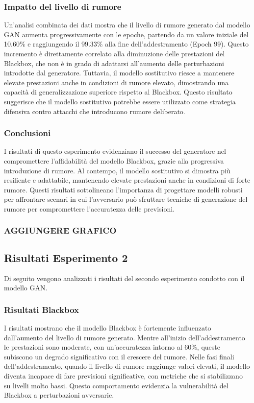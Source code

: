 \subsubsection{Impatto del livello di rumore}
Un'analisi combinata dei dati mostra che il livello di rumore generato dal modello GAN aumenta progressivamente con le epoche, partendo da un valore iniziale del 10.60\% e raggiungendo il 99.33\% alla fine dell'addestramento (Epoch 99). Questo incremento è direttamente correlato alla diminuzione delle prestazioni del Blackbox, che non è in grado di adattarsi all'aumento delle perturbazioni introdotte dal generatore.
Tuttavia, il modello sostitutivo riesce a mantenere elevate prestazioni anche in condizioni di rumore elevato, dimostrando una capacità di generalizzazione superiore rispetto al Blackbox. Questo risultato suggerisce che il modello sostitutivo potrebbe essere utilizzato come strategia difensiva contro attacchi che introducono rumore deliberato.
\subsubsection{Conclusioni}
I risultati di questo esperimento evidenziano il successo del generatore nel compromettere l'affidabilità del modello Blackbox, grazie alla progressiva introduzione di rumore. Al contempo, il modello sostitutivo si dimostra più resiliente e adattabile, mantenendo elevate prestazioni anche in condizioni di forte rumore. Questi risultati sottolineano l'importanza di progettare modelli robusti per affrontare scenari in cui l'avversario può sfruttare tecniche di generazione del rumore per compromettere l'accuratezza delle previsioni.
\subsubsection{AGGIUNGERE GRAFICO}

\subsection{Risultati Esperimento 2}
Di seguito vengono analizzati i risultati del secondo esperimento condotto con il modello GAN.
\subsubsection{Risultati Blackbox}
I risultati mostrano che il modello Blackbox è fortemente influenzato dall'aumento del livello di rumore generato. Mentre all'inizio dell'addestramento le prestazioni sono moderate, con un'accuratezza intorno al 60\%, queste subiscono un degrado significativo con il crescere del rumore. Nelle fasi finali dell'addestramento, quando il livello di rumore raggiunge valori elevati, il modello diventa incapace di fare previsioni significative, con metriche che si stabilizzano su livelli molto bassi. Questo comportamento evidenzia la vulnerabilità del Blackbox a perturbazioni avversarie.
